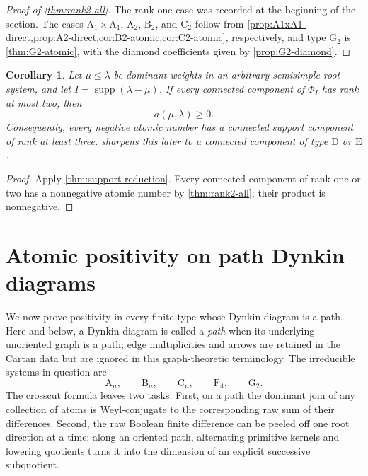 \documentclass[11pt]{article}
\newtheorem{corollary}[corollary]{Corollary}
\theoremstyle{definition}
\theoremstyle{remark}
\newcommand{\Raiz}{\Phi}
\newcommand{\supp}{\operatorname{supp}}
\newcommand{\typeA}{\ensuremath{\mathrm{A}}}
\newcommand{\typeB}{\ensuremath{\mathrm{B}}}
\newcommand{\typeC}{\ensuremath{\mathrm{C}}}
\newcommand{\typeD}{\ensuremath{\mathrm{D}}}
\newcommand{\typeE}{\ensuremath{\mathrm{E}}}
\newcommand{\typeF}{\ensuremath{\mathrm{F}}}
\newcommand{\typeG}{\ensuremath{\mathrm{G}}}
\begin{document}
\begin{proof}[Proof of \cref{thm:rank2-all}]
The rank-one case was recorded at the beginning of the section.  The cases
$\typeA_1\times\typeA_1$, $\typeA_2$, $\typeB_2$, and $\typeC_2$ follow from
\cref{prop:A1xA1-direct,prop:A2-direct,cor:B2-atomic,cor:C2-atomic},
respectively, and type $\typeG_2$ is \cref{thm:G2-atomic}, with the diamond
coefficients given by \cref{prop:G2-diamond}.
\end{proof}

\begin{corollary}
\label{cor:rank2-support}
Let $\mu\le\lambda$ be dominant weights in an arbitrary semisimple root
system, and let $I=\supp(\lambda-\mu)$.  If every connected component of
$\Raiz_I$ has rank at most two, then
\[
       a(\mu,\lambda)\ge0.
\]
Consequently, every negative atomic number has a connected support component
of rank at least three.   sharpens this later to a
connected component of type $\typeD$ or $\typeE$.
\end{corollary}

\begin{proof}
Apply \cref{thm:support-reduction}.
Every connected component of rank one or two has a nonnegative atomic number
by \cref{thm:rank2-all}; their product is nonnegative.
\end{proof}



\section{Atomic positivity on path Dynkin diagrams}\label{sec:path-positive}

We now prove positivity in every finite type whose Dynkin diagram is a path.
Here and below, a Dynkin diagram is called a \emph{path} when its underlying
unoriented graph is a path; edge multiplicities and arrows are retained in the
Cartan data but are ignored in this graph-theoretic terminology.  The
irreducible systems in question are
\[
   \typeA_n,\qquad \typeB_n,\qquad \typeC_n,\qquad \typeF_4,
   \qquad \typeG_2.
\]
The crosscut formula leaves two tasks.  First, on a path the dominant join of
any collection of atoms is Weyl-conjugate to the corresponding raw sum of
their differences.  Second, the raw Boolean finite difference can be peeled
off one root direction at a time: along an oriented path, alternating primitive
kernels and lowering quotients turns it into the dimension of an explicit
successive subquotient.
\end{document}
